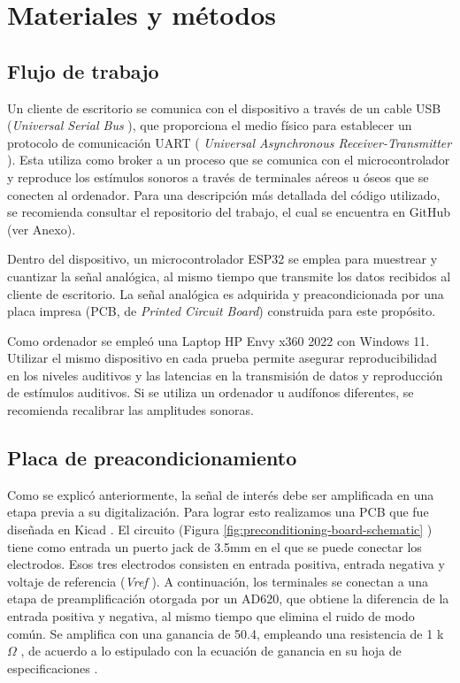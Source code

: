 \section{Materiales y métodos} \label{materiales_metodos}

\subsection{Flujo de trabajo}

Un cliente de escritorio se comunica con el dispositivo a través de un cable USB (\textit{Universal Serial Bus}
), que proporciona el medio físico para establecer un protocolo de comunicación UART (
\textit{Universal Asynchronous Receiver-Transmitter}
). Esta utiliza como broker a un proceso que se comunica con el microcontrolador y reproduce los estímulos sonoros a
través de terminales aéreos u óseos que se conecten al ordenador. Para una descripción más detallada del código
utilizado, se recomienda consultar el repositorio del trabajo, el cual se encuentra en GitHub (ver Anexo).

Dentro del dispositivo, un microcontrolador ESP32 \cite{espressif-systems-ESP32}
se emplea para muestrear y cuantizar la señal analógica, al mismo tiempo que transmite los datos recibidos al cliente de
escritorio. La señal analógica es adquirida y preacondicionada por una placa impresa (PCB, de
\textit{Printed Circuit Board}) construida para este propósito.

Como ordenador se empleó una Laptop HP Envy x360 2022 con Windows 11. Utilizar el mismo dispositivo en cada prueba
permite asegurar reproducibilidad en los niveles auditivos y las latencias en la transmisión de datos y reproducción de
estímulos auditivos. Si se utiliza un ordenador u audífonos diferentes, se recomienda recalibrar las amplitudes sonoras.

\subsection{Placa de preacondicionamiento}

Como se explicó anteriormente, la señal de interés debe ser amplificada en una etapa previa a su digitalización. Para
lograr esto realizamos una PCB que fue diseñada en Kicad \cite{kicad}. El circuito (Figura
\ref{fig:preconditioning-board-schematic}
) tiene como entrada un puerto jack de 3.5mm en el que se puede conectar los electrodos. Esos tres electrodos consisten
en entrada positiva, entrada negativa y voltaje de referencia (\textit{Vref}
). A continuación, los terminales se conectan a una etapa de preamplificación otorgada por un AD620, que obtiene la
diferencia de la entrada positiva y negativa, al mismo tiempo que elimina el ruido de modo común. Se amplifica con una
ganancia de 50.4, empleando una resistencia de 1 k$\Omega$
, de acuerdo a lo estipulado con la ecuación de ganancia en su hoja de especificaciones \cite{analog-devices-no-date}.

